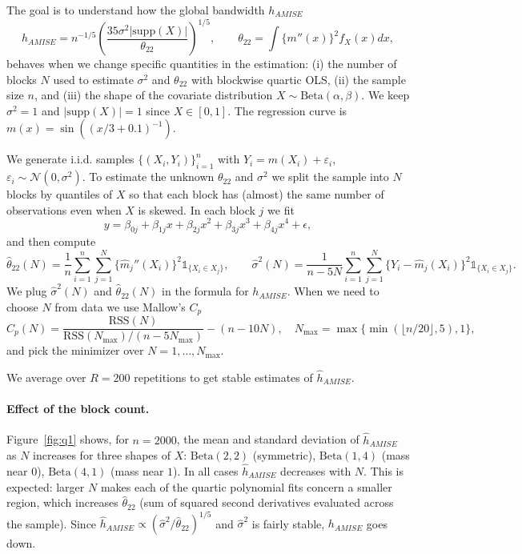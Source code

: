 \documentclass[11pt]{article}
\begin{document}
The goal is to understand how the global bandwidth \(h_{AMISE}\)
\[
h_{AMISE}=n^{-1/5}\left(\frac{35\sigma^2|\mathrm{supp}(X)|}{\theta_{22}}\right)^{1/5},
\qquad 
\theta_{22}=\int \{m''(x)\}^2 f_X(x)dx,
\]
behaves when we change specific quantities in the estimation:
(i) the number of blocks \(N\) used to estimate \(\sigma^2\) and \(\theta_{22}\) with blockwise quartic OLS,
(ii) the sample size \(n\),
and (iii) the shape of the covariate distribution \(X\sim\mathrm{Beta}(\alpha,\beta)\).
We keep \(\sigma^2=1\) and \(|\mathrm{supp}(X)|=1\) since \(X\in[0,1]\).
The regression curve is \(m(x)=\sin((x/3+0.1)^{-1})\).


We generate i.i.d. samples \(\{(X_i,Y_i)\}_{i=1}^n\) with \(Y_i=m(X_i)+\varepsilon_i\), \(\varepsilon_i\sim\mathcal N(0,\sigma^2)\).
To estimate the unknown \(\theta_{22}\) and \(\sigma^2\) we split the sample into \(N\) blocks by quantiles of \(X\) so that each block has (almost) the same number of observations even when \(X\) is skewed. In each block \(j\) we fit
\[
y=\beta_{0j}+\beta_{1j}x+\beta_{2j}x^2+\beta_{3j}x^3+\beta_{4j}x^4+\epsilon,
\]
and then compute
\[
\hat{\theta}_{22}(N)=\frac{1}{n}\sum_{i=1}^n\sum_{j=1}^N \{\hat m_j''(X_i)\}^2 \mathbb{1}_{\{X_i\in X_j\}},\qquad
\hat\sigma^2(N)=\frac{1}{n-5N}\sum_{i=1}^n\sum_{j=1}^N \{Y_i-\hat m_j(X_i)\}^2 \mathbb{1}_{\{X_i\in X_j\}}.
\]
We plug \(\hat\sigma^2(N)\) and \(\hat\theta_{22}(N)\) in the formula for \(h_{AMISE}\).
When we need to choose \(N\) from data we use Mallow's \(C_p\)
\[
C_p(N)=\frac{\mathrm{RSS}(N)}{\mathrm{RSS}(N_{\max})/(n-5N_{\max})}-(n-10N),
\quad N_{\max}=\max\{\min(\lfloor n/20\rfloor,5),1\},
\]
and pick the minimizer over \(N=1,\dots,N_{\max}\).

We average over \(R=200\) repetitions to get stable estimates of \(\hat h_{AMISE}\).


\paragraph{Effect of the block count.}
Figure~\ref{fig:q1} shows, for \(n=2000\), the mean and standard deviation of \(\hat h_{AMISE}\) as \(N\) increases for three shapes of \(X\): \(\mathrm{Beta}(2,2)\) (symmetric), \(\mathrm{Beta}(1,4)\) (mass near \(0\)), \(\mathrm{Beta}(4,1)\) (mass near \(1\)).
In all cases \(\hat h_{AMISE}\) decreases with \(N\).
This is expected: larger \(N\) makes each of the quartic polynomial fits concern a smaller region, which increases \(\hat{\theta}_{22}\) (sum of squared second derivatives evaluated across the sample).
Since \(\hat h_{AMISE}\propto(\hat\sigma^2/\hat\theta_{22})^{1/5}\) and \(\hat\sigma^2\) is fairly stable, \(h_{AMISE}\) goes down.
\end{document}
